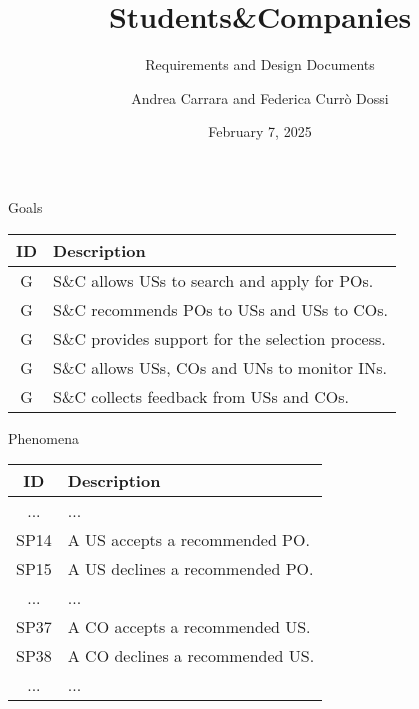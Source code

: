 \documentclass{beamer}
\title{Students\&Companies}
\subtitle{Requirements and Design Documents}
\author{Andrea Carrara and Federica Currò Dossi}
\date{February 7, 2025}
\begin{document}
\begin{frame}
    \maketitle
\end{frame}

\begin{frame}{Goals}
\setcounter{g}{1}
\newcommand{\gc}{\theg\stepcounter{g}}
\renewcommand{\arraystretch}{1.5}
\begin{longtable}{|c|p{8cm}|}
    \hline \rowcolor{polimiblue!40}
    \textbf{ID} & \textbf{Description} \\ \hline
    G\gc & S\&C allows USs to search and apply for POs. \\ \hline
    G\gc & S\&C recommends POs to USs and USs to COs. \\ \hline
    G\gc & S\&C provides support for the selection process. \\ \hline
    G\gc & S\&C allows USs, COs and UNs to monitor INs. \\ \hline
    G\gc & S\&C collects feedback from USs and COs. \\ \hline
\end{longtable}
\end{frame}

\begin{frame}{Phenomena}
\renewcommand{\arraystretch}{1.5}
\begin{longtable}{|c|p{8cm}|}
    \hline \rowcolor{polimiblue!40}
    \textbf{ID} & \textbf{Description} \\ \hline
    ... & ... \\ \hline
    SP14 & A US accepts a recommended PO. \\ \hline
    SP15 & A US declines a recommended PO. \\ \hline
    ... & ... \\ \hline
    SP37 & A CO accepts a recommended US. \\ \hline
    SP38 & A CO declines a recommended US. \\ \hline
    ... & ... \\ \hline
\end{longtable}
\end{frame}
\end{document}
